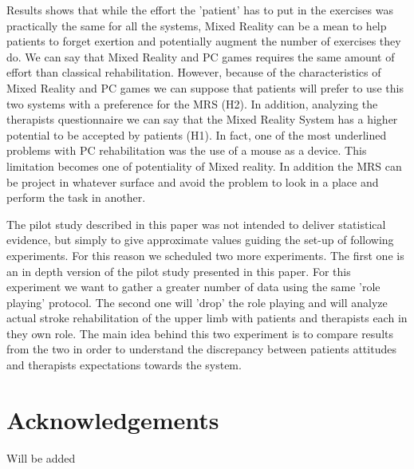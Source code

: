 \documentclass[preprint,authoryear,12pt]{elsarticle}
\begin{document}
Results shows that while the effort the 'patient' has to put in the exercises was practically the same for all the systems,  Mixed Reality can be a mean to help patients to forget exertion and potentially augment the number of exercises they do.
We can say that Mixed Reality and PC games requires the same amount of effort than classical rehabilitation. However, because of the characteristics of Mixed Reality and PC games we can suppose that patients will prefer to use this two systems with a preference for the MRS (H2).
In addition, analyzing the therapists questionnaire we can say that the Mixed Reality System has a higher potential to be accepted by patients (H1). 
In fact, one of the most underlined problems with PC rehabilitation was the use of a mouse as a device. This limitation becomes one of potentiality of Mixed reality. In addition the MRS can be project in whatever surface and avoid the problem to look in a place and perform the task in another. 

The pilot study  described in this paper was not intended to deliver statistical evidence, but simply to give approximate values guiding the set-up of following experiments. 
For this reason we scheduled two more experiments. 
The first one is an in depth version of the pilot study presented in this paper. For this experiment we want to gather a greater number of data using the same 'role playing' protocol. 
The second one will 'drop' the role playing and will analyze actual stroke rehabilitation of the upper limb with patients and therapists each in they own role. 
The main idea behind this two experiment is to compare  results from the two in order to understand the discrepancy between patients attitudes and therapists expectations towards the system.



\section{Acknowledgements}
\label{acknowledgements}
 Will be added
\end{document}
